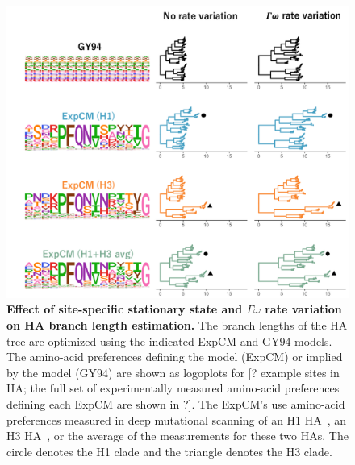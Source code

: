 \documentclass[11pt]{article}
\newcommand\jdbcomment[1]{{\color{red}[#1]}}
\begin{document}
\begin{figure}
\centerline{\includegraphics[width=\textwidth]{figures/empirical_trees.pdf}}
\caption{\label{fig:empirical_trees}
\textbf{Effect of site-specific stationary state and $\Gamma\omega$ rate variation on HA branch length estimation.} 
The branch lengths of the HA tree are optimized using the indicated ExpCM and GY94 models. 
The amino-acid preferences defining the model (ExpCM) or implied by the model (GY94) are shown as logoplots for \jdbcomment{? example sites in HA; the full set of experimentally measured amino-acid preferences defining each ExpCM are shown in ?}. 
The ExpCM's use amino-acid preferences measured in deep mutational scanning of an H1 HA~\cite{doud2016accurate}, an H3 HA~\citep{lee2018deep}, or the average of the measurements for these two HAs.
The circle denotes the H1 clade and the triangle denotes the H3 clade. 
}
\end{figure}
\end{document}
